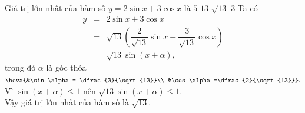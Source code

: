 \begin{ex}%
	Giá trị lớn nhất của hàm số $y=2\sin x + 3\cos x$ là
	\choice
	{$5$}
	{$13$}
	{\True $\sqrt{13}$}
	{$3$}
	\loigiai
	{
		Ta có
		\begin{eqnarray*}
			y&=&2\sin x + 3\cos x\\
			&=&\sqrt{13}\left(\dfrac{2}{\sqrt{13}}\sin x+ \dfrac{3}{\sqrt{13}}\cos x\right)\\
			&=&\sqrt{13}\sin(x+\alpha),
		\end{eqnarray*}
		trong đó $\alpha$ là góc thỏa $\heva{&\sin \alpha = \dfrac{3}{\sqrt{13}}\\ &\cos\alpha=\dfrac{2}{\sqrt{13}}}.$\\
		Vì $\sin(x+\alpha)\leq 1$ nên $\sqrt{13}\sin(x+\alpha)\leq 1$.\\
		Vậy giá trị lớn nhất của hàm số là $\sqrt{13}$.
	}
\end{ex}


